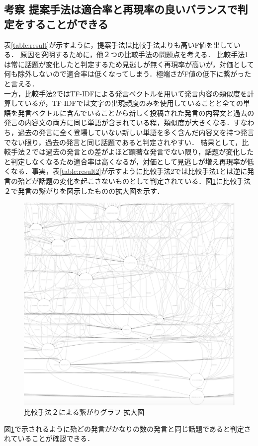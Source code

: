 \subsection*{考察 提案手法は適合率と再現率の良いバランスで判定をすることができる}
表\ref{table:result}が示すように，提案手法は比較手法よりも高いF値を出している．
原因を究明するために，他２つの比較手法の問題点を考える．
比較手法1は常に話題が変化したと判定するため見逃しが無く再現率が高いが，対価として何も除外しないので適合率は低くなってしまう．極端さがF値の低下に繋がったと言える．\\
一方，比較手法2ではTF-IDFによる発言ベクトルを用いて発言内容の類似度を計算しているが，TF-IDFでは文字の出現頻度のみを使用していることと全ての単語を発言ベクトルに含んでいることから新しく投稿された発言の内容文と過去の発言の内容文の両方に同じ単語が含まれている程，類似度が大きくなる．すなわち，過去の発言に全く登場していない新しい単語を多く含んだ内容文を持つ発言でない限り，過去の発言と同じ話題であると判定されやすい．
結果として，比較手法２では過去の発言との差がよほど顕著な発言でない限り，話題が変化したと判定しなくなるため適合率は高くなるが，対価として見逃しが増え再現率が低くなる．事実，表\ref{table:result2}が示すように比較手法2では比較手法1とは逆に発言の殆どが話題の変化を起こさないものとして判定されている．図\ref{Fig:GraphTF-IDF}に比較手法２で発言の繋がりを図示したものの拡大図を示す．\\
\begin{figure}[htbp]
 \begin{center}
  \includegraphics[width=\textwidth]{../images/5.Experiment/Graph=TF-IDF2.png}
  \caption{比較手法２による繋がりグラフ-拡大図}
  \label{Fig:GraphTF-IDF}
  \vspace{-10pt}
 \end{center}
\end{figure}
図\ref{Fig:GraphTF-IDF}で示されるように殆どの発言がかなりの数の発言と同じ話題であると判定されていることが確認できる．

